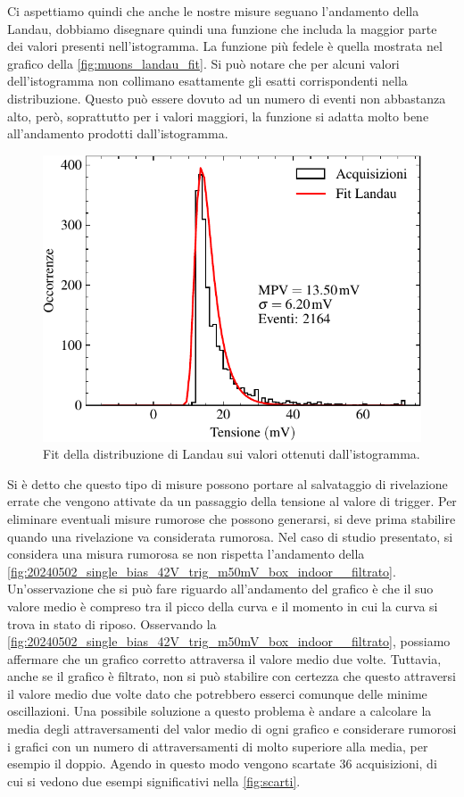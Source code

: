 Ci aspettiamo quindi che anche le nostre misure seguano l'andamento della Landau, dobbiamo disegnare quindi una funzione che includa 
la maggior parte dei valori presenti nell'istogramma. La funzione più fedele è quella mostrata nel grafico della \autoref*{fig:muons_landau_fit}.
Si può notare che per alcuni valori dell'istogramma non collimano esattamente gli esatti corrispondenti nella distribuzione. Questo può
essere dovuto ad un numero di eventi non abbastanza alto, però, soprattutto per i valori maggiori, la funzione si adatta molto bene all'andamento
prodotti dall'istogramma.
\begin{figure}[h!]
    \centering
    \includegraphics[width=.75\linewidth]{img/muons_landau_fit.pdf}
    \caption{Fit della distribuzione di Landau sui valori ottenuti dall'istogramma.}
    \label{fig:muons_landau_fit}
\end{figure}

Si è detto che questo tipo di misure possono portare al salvataggio di rivelazione errate che vengono attivate da un passaggio della tensione
al valore di trigger. Per eliminare eventuali misure rumorose che possono generarsi, si deve prima stabilire quando una rivelazione va 
considerata rumorosa. Nel caso di studio presentato, si considera una misura rumorosa se non rispetta l'andamento della
\autoref*{fig:20240502_single_bias_42V_trig_m50mV_box_indoor__filtrato}.
Un'osservazione che si può fare riguardo all'andamento del grafico è che il suo valore medio è compreso tra il picco della curva e il momento
in cui la curva si trova in stato di riposo. Osservando la \autoref*{fig:20240502_single_bias_42V_trig_m50mV_box_indoor__filtrato},
possiamo affermare che un grafico corretto attraversa il valore medio due volte. Tuttavia, anche se il grafico è filtrato, non si può
stabilire con certezza che questo attraversi il valore medio due volte dato che potrebbero esserci comunque delle minime oscillazioni.
Una possibile soluzione a questo problema è andare a calcolare la media degli attraversamenti del valor medio di ogni grafico e
considerare rumorosi i grafici con un numero di attraversamenti di molto superiore alla media, per esempio il doppio.
Agendo in questo modo vengono scartate 36 acquisizioni, di cui si vedono due esempi significativi nella \autoref*{fig:scarti}.

